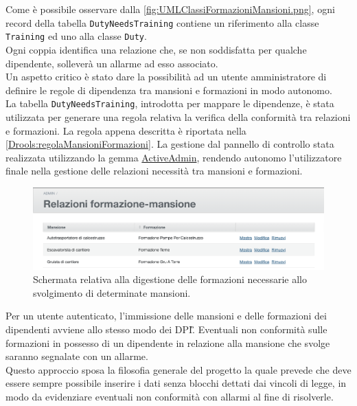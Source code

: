 Come è possibile osservare dalla \autoref{fig:UMLClassiFormazioniMansioni.png}, ogni record della tabella \texttt{DutyNeedsTraining} contiene un riferimento alla classe \texttt{Training} ed uno alla classe \texttt{Duty}.\\
Ogni coppia identifica una relazione che, se non soddisfatta per qualche dipendente, solleverà un allarme ad esso associato.\\
Un aspetto critico è stato dare la possibilità ad un utente amministratore di definire le regole di dipendenza tra mansioni e formazioni in modo autonomo. \\
La tabella \texttt{DutyNeedsTraining}, introdotta per mappare le dipendenze, è stata utilizzata per generare una regola relativa la verifica della conformità tra relazioni e formazioni. La regola appena descritta è riportata nella \autoref{Drools:regolaMansioniFormazioni}.
La gestione dal pannello di controllo  stata realizzata utilizzando la gemma \hyperref[sec:ActiveAdmin]{ActiveAdmin}, rendendo  autonomo l'utilizzatore finale nella gestione delle relazioni necessità tra mansioni e formazioni.
\begin{figure}[H]
	\begin{center}
		\includegraphics[width=14cm]{Pics/ScreenFormazioneMansioneAdmin.png}
		\caption{Schermata relativa alla digestione delle formazioni necessarie allo svolgimento di determinate mansioni.}
		\label{fig:ScreenFormazioneMansioneAdmin.png}
	\end{center}
\end{figure}
Per un utente autenticato, l'immissione delle mansioni e delle formazioni dei dipendenti avviene allo stesso modo dei \gls{DPI}\G. Eventuali non conformità sulle formazioni in possesso di un dipendente in relazione alla mansione che svolge saranno segnalate con un allarme. \\
 Questo approccio sposa la filosofia generale del progetto la quale prevede che deve essere sempre possibile inserire i dati senza blocchi dettati dai vincoli di legge, in modo da evidenziare eventuali non conformità con allarmi al fine di risolverle.
\newpage
